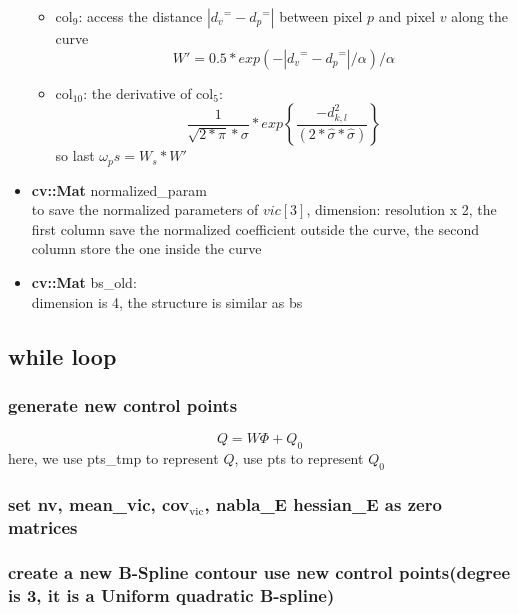 \documentclass[11pt]{article}
\begin{document}
\begin{itemize}
\begin{itemize}
\item col$_9$:  access the distance $|{d_v}^{=} - {d_p}^{=}|$ between pixel $p$ and pixel $v$ along the curve
\label{sec-1_1_2_15_6}%
\begin{displaymath}
      W' = 0.5*exp(-|{d_v}^{=} - {d_p}^{=}|/\alpha)/\alpha
\end{displaymath}


\item col$_{\mathrm{10}}$: the derivative of col$_5$:
\label{sec-1_1_2_15_7}%
\begin{displaymath}
\frac{1}{\sqrt{2*\pi}*\sigma}*exp \left\{ \frac{-d_{k,l}^2}{(2*\hat{\sigma}*\hat{\sigma})} \right\} 
\end{displaymath}
so last $\omega_ps = W_s * W'$
\end{itemize} %

\item \textbf{cv::Mat} normalized\_param\\
\label{sec-1_1_2_16}%
to save the normalized parameters of $vic[3]$,
dimension: resolution x 2,
the first column save the normalized coefficient outside the curve,
the second column store the one inside the curve

\item \textbf{cv::Mat} bs\_old:\\
\label{sec-1_1_2_17}%
dimension is 4, the structure is similar as bs
\end{itemize} %
\subsection{while loop}
\label{sec-1_2}
\subsubsection{generate new control points}
\label{sec-1_2_1}

\begin{displaymath}
Q = W\Phi + Q_0
\end{displaymath}
here, we use pts\_tmp to represent $Q$, use pts to represent $Q_0$
\subsubsection{set nv, mean\_vic, cov$_{\mathrm{vic}}$, nabla\_E hessian\_E as zero matrices}
\label{sec-1_2_2}
\subsubsection{create a new B-Spline contour use new control points(degree is 3, it is a Uniform quadratic B-spline)}
\label{sec-1_2_3}
\end{document}
